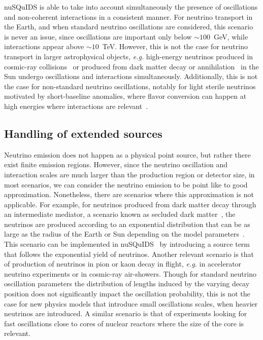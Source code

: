 \documentclass[3p,12pt]{elsarticle}
\newcommand{\ttf}{\ttfamily}
\begin{document}
{\ttf nuSQuIDS} is able to take into account simultaneously the presence of oscillations and non-coherent interactions in a consistent manner.
For neutrino transport in the Earth, and when standard neutrino oscillations are considered, this scenario is never an issue, since oscillations are important only below $\sim100$~GeV, while interactions appear above $\sim10$~TeV.
However, this is not the case for neutrino transport in larger astrophysical objects, \textit{e.g.} high-energy neutrinos produced in cosmic-ray collisions~\cite{Moskalenko:1991hm,Seckel:1991ffa,Ingelman:1996mj,Masip:2017gvw,Ng:2017aur,Edsjo:2017kjk,Arguelles:2017eao,IceCube:2021koo} or produced from dark matter decay or annihilation~\cite{Srednicki:1986vj,Kamionkowski:1991nj,Cirelli:2005gh,Blennow:2007tw,Barger:2007xf,Liu:2020ckq} in the Sun undergo oscillations and interactions simultaneously.
Additionally, this is not the case for non-standard neutrino oscillations, notably for light sterile neutrinos motivated by short-baseline anomalies, where flavor conversion can happen at high energies where interactions are relevant~\cite{Akhmedov:1988kd,Krastev:1989ix,Chizhov:1998ug,Chizhov:1999az,Akhmedov:1999va,Nunokawa:2003ep,Choubey:2007ji,Barger:2011rc,Esmaili:2012nz,Esmaili:2013vza,Lindner:2015iaa}.

\subsection{Handling of extended sources}

Neutrino emission does not happen as a physical point source, but rather there exist finite emission regions.
However, since the neutrino oscillation and interaction scales are much larger than the production region or detector size, in most scenarios, we can consider the neutrino emission to be point like to good approximation.
Nonetheless, there are scenarios where this approximation is not applicable.
For example, for neutrinos produced from dark matter decay through an intermediate mediator, a scenario known as secluded dark matter~\cite{Pospelov:2007mp}, the neutrinos are produced according to an exponential distribution that can be as large as the radius of the Earth or Sun depending on the model parameters~\cite{Niblaeus:2019gjk,Liu:2020ckq}.
This scenario can be implemented in nuSQuIDS~\cite{Liu:2020ckq} by introducing a source term that follows the exponential yield of neutrinos.
Another relevant scenario is that of production of neutrinos in pion or kaon decay in flight, \textit{e.g.} in accelerator neutrino experiments or in cosmic-ray air-showers.
Though for standard neutrino oscillation parameters the distribution of lengths induced by the varying decay position does not significantly impact the oscillation probability, this is not the case for new physics models that introduce small oscillations scales,  when heavier neutrinos are introduced.
A similar scenario is that of experiments looking for fast oscillations close to cores of nuclear reactors where the size of the core is relevant.
\end{document}
